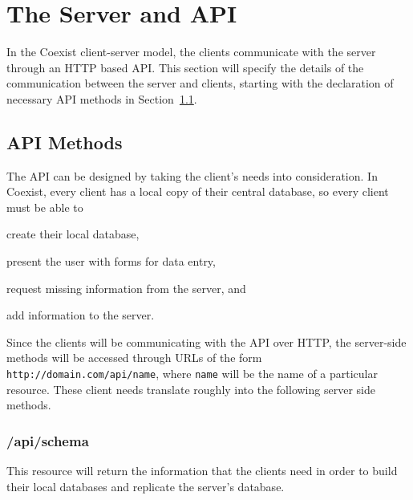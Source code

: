 \section{The Server and API} \label{sec:api}

In the Coexist client-server model, the clients communicate with the server
through an HTTP based API. This section will specify the details of the
communication between the server and clients, starting with the declaration of
necessary API methods in Section~\ref{sec:api_methods}.


\subsection{API Methods}  \label{sec:api_methods}



The API can be designed by taking the client's needs into
consideration. In Coexist, every client has a local copy of their central
database, so every client must be able to
\begin{inparaenum}
\item create their local database,
\item present the user with forms for data entry,
\item request missing information from the server, and
\item add information to the server.
\end{inparaenum}
Since the clients will be communicating with the API over HTTP, the server-side
methods will be accessed through URLs of the form
\mbox{\texttt{http://domain.com/api/name}}, where \texttt{name} will be
the name of a particular resource. These client needs translate roughly into the
following server side methods.

\subsubsection{/api/schema}  \label{sec:api_schema}
This resource will return the information that the clients need in order to
build their local databases and replicate the server's database.

